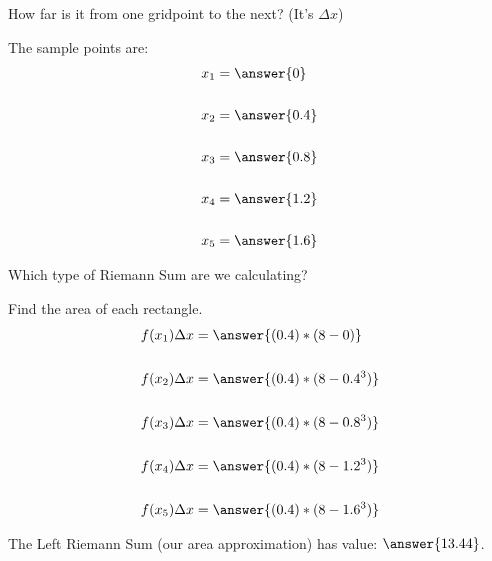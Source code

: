 \documentclass{ximera}
\begin{document}
\begin{exercise}
\begin{exercise}
\begin{exercise}
\begin{hint}
				How far is it from one gridpoint to the next?  (It's $\Delta x$)
			\end{hint}
			\begin{exercise}
				The sample points are:
				\begin{align*}
					x_1 &= \answer{0} \\ \\
					x_2 &= \answer{0.4} \\ \\
					x_3 &= \answer{0.8} \\ \\
					x_4 &= \answer{1.2} \\ \\
					x_5 &= \answer{1.6}
				\end{align*}
				\begin{hint}
					Which type of Riemann Sum are we calculating?
				\end{hint}

				\begin{exercise}
					Find the area of each rectangle.
					\begin{align*}
					f(x_1)\Delta x &= \answer{(0.4)*(8-0)} \\ \\
					f(x_2)\Delta x &= \answer{(0.4)*(8-0.4^3)} \\ \\
					f(x_3)\Delta x &= \answer{(0.4)*(8-0.8^3)} \\ \\
					f(x_4)\Delta x &= \answer{(0.4)*(8-1.2^3)} \\ \\
					f(x_5)\Delta x &= \answer{(0.4)*(8-1.6^3)}
				\end{align*}
				
				\begin{exercise}
					The Left Riemann Sum (our area approximation) has value:
					$\answer{13.44}$.
				\end{exercise}
					
				\end{exercise}
			\end{exercise}			
		\end{exercise}
	\end{exercise}

\end{exercise}
\end{document}
